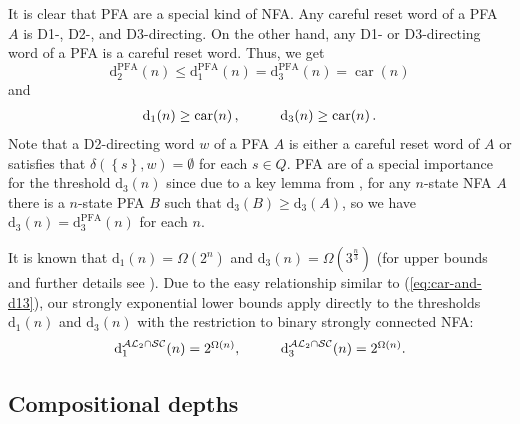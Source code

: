 \documentclass{ws-ijmpc}
\DeclareMathOperator{\car}{car}
\begin{document}
It is clear that PFA are a special kind of NFA. Any careful reset
word of a PFA $A$ is D1-, D2-, and D3-directing. On the other hand,
any D1- or D3-directing word of a PFA is a careful reset word. Thus,
we get
\[
\mathrm{d_{2}^{PFA}}\!\left(n\right)\le\mathrm{d_{1}^{PFA}}\!\left(n\right)=\mathrm{d_{3}^{PFA}}\!\left(n\right)=\car\!\left(n\right)
\]
and
\begin{equation}
\begin{array}{cc}
\mathrm{d_{1}}\!\left(n\right)\ge\car\!\left(n\right),\hspace{20bp} & \mathrm{d_{3}}\!\left(n\right)\ge\car\!\left(n\right).\end{array}\label{eq:car-and-d13}
\end{equation}
Note that a D2-directing word $w$ of a PFA $A$ is either a careful
reset word of $A$ or satisfies that $\delta\!\left(\left\{ s\right\} ,w\right)=\emptyset$
for each $s\in Q$. PFA are of a special importance for the threshold
$\mathrm{d_{3}}\!\left(n\right)$ since due to a key lemma from \citep{ITO1short},
for any $n$-state NFA $A$ there is a $n$-state PFA $B$ such that
$\mathrm{d_{3}}\!\left(B\right)\ge\mathrm{d_{3}}\!\left(A\right)$,
so we have $\mathrm{d_{3}}\!\left(n\right)=\mathrm{d_{3}^{PFA}}\!\left(n\right)$
for each $n$.

It is known that $\mathrm{d_{1}}\!\left(n\right)=\Omega\!\left(2^{n}\right)$
\citep{ITO1short} and $\mathrm{d_{3}}\!\left(n\right)=\Omega\!\left(3^{\frac{n}{3}}\right)$
\citep{MAR6} (for upper bounds and further details see \citep{GAZ1}).
Due to the easy relationship similar to (\ref{eq:car-and-d13}), our
strongly exponential lower bounds apply directly to the thresholds
$\mathrm{d_{1}}\!\left(n\right)$ and $\mathrm{d_{3}}\!\left(n\right)$
with the restriction to binary strongly connected NFA:
\[
\begin{array}{cc}
\mathrm{d_{1}^{\mathcal{AL}_{2}\cap\mathcal{SC}}}\!\left(n\right)=2^{\Omega\left(n\right)},\hspace{20bp} & \mathrm{d_{3}^{\mathcal{AL}_{2}\cap\mathcal{SC}}}\!\left(n\right)=2^{\Omega\left(n\right)}.\end{array}
\]



\subsection{Compositional depths}
\end{document}
